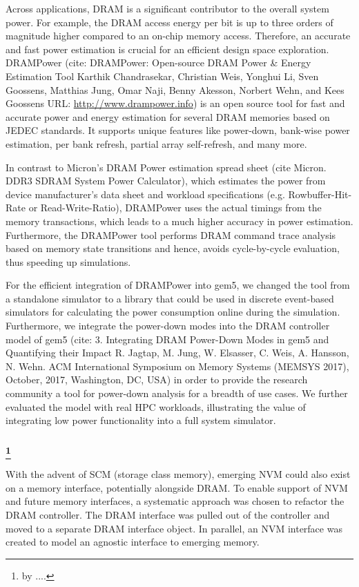 Across applications, DRAM is a significant contributor to the overall system power.
For example, the DRAM access energy per bit is up to three orders of magnitude higher compared to an on-chip memory access.
Therefore, an accurate and fast power estimation is crucial for an efficient design space exploration.
DRAMPower (cite: DRAMPower: Open-source DRAM Power \& Energy Estimation Tool Karthik Chandrasekar, Christian Weis, Yonghui Li, Sven Goossens, Matthias Jung, Omar Naji, Benny Akesson, Norbert Wehn, and Kees Goossens URL: \url{http://www.drampower.info}) is an open source tool for fast and accurate power and energy estimation for several DRAM memories based on JEDEC standards.
It supports unique features like power-down, bank-wise power estimation, per bank refresh, partial array self-refresh, and many more.

In contrast to Micron’s DRAM Power estimation spread sheet (cite Micron. DDR3 SDRAM System Power Calculator), which estimates the power from device manufacturer’s data sheet and workload specifications (e.g. Rowbuffer-Hit-Rate or Read-Write-Ratio), DRAMPower uses the actual timings from the memory transactions, which leads to a much higher accuracy in power estimation.
Furthermore, the DRAMPower tool performs DRAM command trace analysis based on memory state transitions and hence, avoids cycle-by-cycle evaluation, thus speeding up simulations.

For the efficient integration of DRAMPower into gem5, we changed the tool from a standalone simulator to a library that could be used in discrete event-based simulators for calculating the power consumption online during the simulation.
Furthermore, we integrate the power-down modes into the DRAM controller model of gem5 (cite: 3.	Integrating DRAM Power-Down Modes in gem5 and Quantifying their Impact R. Jagtap, M. Jung, W. Elsasser, C. Weis, A. Hansson, N. Wehn. ACM International Symposium on Memory Systems (MEMSYS 2017), October, 2017, Washington, DC, USA) in order to provide the research community a tool for power-down analysis for a breadth of use cases. We further evaluated the model with real HPC workloads, illustrating the value of integrating low power functionality into a full system simulator.


\subsubsection[Future Improvements to Off Chip Memory Models]{\footnote{by ....}}

With the advent of SCM (storage class memory), emerging NVM could also exist on a memory interface, potentially alongside DRAM.
To enable support of NVM and future memory interfaces, a systematic approach was chosen to refactor the DRAM controller.
The DRAM interface was pulled out of the controller and moved to a separate DRAM interface object.
In parallel, an NVM interface was created to model an agnostic interface to emerging memory.

